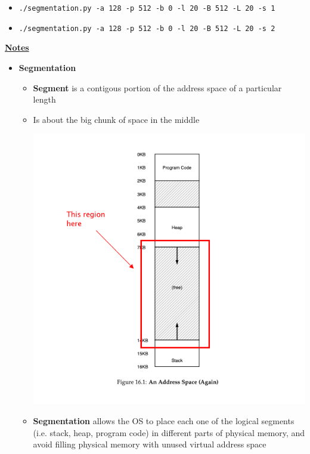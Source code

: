 \documentclass[12pt]{article}
\begin{document}
\begin{enumerate}[1.]
\begin{itemize}
        \item \texttt{./segmentation.py -a 128 -p 512 -b 0 -l 20 -B 512 -L 20 -s 1}
        \item \texttt{./segmentation.py -a 128 -p 512 -b 0 -l 20 -B 512 -L 20 -s 2}
    \end{itemize}


    \bigskip

    \underline{\textbf{Notes}}

    \begin{itemize}
        \item \textbf{Segmentation}

        \begin{itemize}
            \item \textbf{Segment} is a contigous portion of the address space of a particular length
            \item Is about the big chunk of space in the middle

            \begin{center}
            \includegraphics[width=0.7\linewidth]{images/worksheet_8_solution_1.png}
            \end{center}

            \item \textbf{Segmentation} allows the OS to place each one of the logical segments (i.e. stack, heap, program code)
            in different parts of physical memory, and avoid filling physical memory with unused virtual address space



\end{itemize}
\end{itemize}
\end{enumerate}
\end{document}
